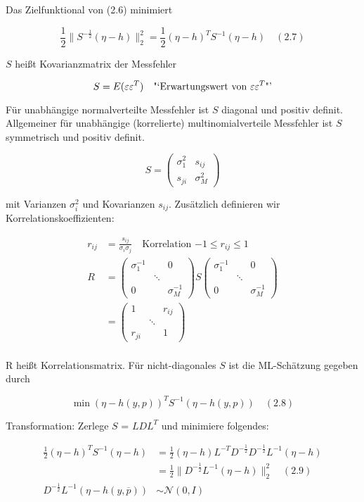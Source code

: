 Das Zielfunktional von (2.6) minimiert

\[ \frac 12 \| S^{-\frac 12} (\eta-h)\|_2^2 = \frac 12 (\eta -h)^T S^{-1} (\eta-h) \quad (2.7) \]

$S$ heißt Kovarianzmatrix der Messfehler

\[S = E (\varepsilon\varepsilon^T) \quad \text{"`Erwartungswert von $\varepsilon\varepsilon^T$"'}\]

Für unabhängige normalverteilte Messfehler ist $S$ diagonal und positiv definit. Allgemeiner für unabhängige (korrelierte) multinomialverteile Messfehler ist $S$ symmetrisch und positiv definit.

\[ S=\begin{pmatrix} \sigma_1^2 & s_{ij} \\ s_{ji} & \sigma_M^2 \end{pmatrix} \]

mit Varianzen $\sigma_i^2$ und Kovarianzen $s_{ij}$. Zusätzlich definieren wir Korrelationskoeffizienten:

\begin{align*}
r_{ij} &= \frac{s_{ij}}{\sigma_i\sigma_j} \quad \text{Korrelation $-1 \leq r_{ij} \leq 1$} \\
R &= \begin{pmatrix} \sigma_1^{-1} & & 0 \\ & \ddots & \\ 0 & & \sigma_M^{-1} \end{pmatrix} S \begin{pmatrix} \sigma_1^{-1} & & 0 \\ & \ddots & \\ 0 & & \sigma_M^{-1} \end{pmatrix} \\
&= \begin{pmatrix} 1 & & r_{ij} \\ & \ddots & \\ r_{ji} & & 1 \end{pmatrix} \\
\end{align*}

R heißt Korrelationsmatrix. Für nicht-diagonales $S$ ist die ML-Schätzung gegeben durch

\[ \min (\eta-h(y,p))^T S^{-1} (\eta-h(y,p)) \quad (2.8)\]

Transformation: Zerlege $S$ = $LDL^T$ und minimiere folgendes:

\begin{align*}
\frac 12 (\eta -h)^T S^{-1} (\eta-h) &= \frac 12 (\eta-h)L^{-T} D^{-\frac 12} D^{-\frac 12} L^{-1} (\eta-h) \\
&= \frac 12 \|D^{-\frac 12} L^{-1}(\eta -h)\|_2^2 \quad (2.9) \\
D^{-\frac 12} L^{-1} (\eta -h(y,\overline p)) &\sim \mathcal N(0,I)
\end{align*}

